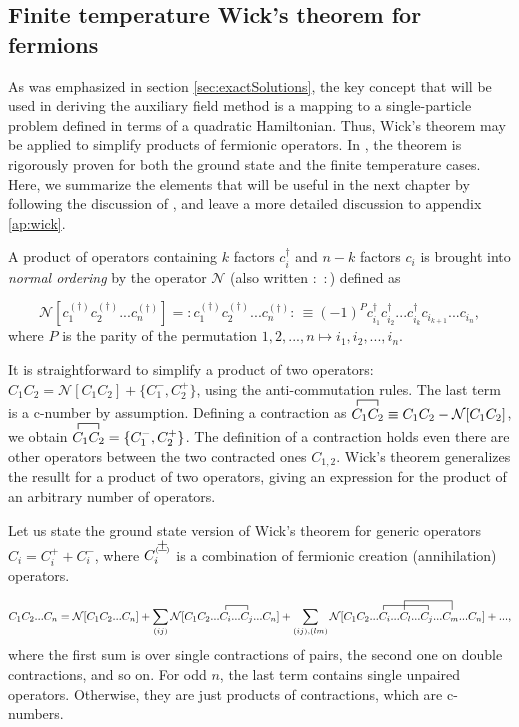 \subsection{Finite temperature Wick's theorem for fermions}
\label{subsec:wick}

As was emphasized in section \ref{sec:exactSolutions}, the key concept that will be used in deriving the auxiliary field method is a mapping to a single-particle problem defined in terms of a quadratic Hamiltonian.
Thus, Wick's theorem may be applied to simplify products of fermionic operators.
In \cite{fetter_quantum_2003}, the theorem is rigorously proven for both the ground state and the finite temperature cases.
Here, we summarize the elements that will be useful in the next chapter by following the discussion of \cite{molinari_notes_2017}, and leave a more detailed discussion to appendix \ref{ap:wick}.

A product of operators containing $k$ factors $c_i^\dagger$ and $n - k$ factors $c_i$ is brought into \emph{normal ordering} by the operator $\mathcal{N}$ (also written $: \,\,:$) defined as

\begin{equation}
\mathcal{N} [ c_1^{(\dagger)} c_2^{(\dagger)} ... c_n^{(\dagger)} ] = :  c_1^{(\dagger)} c_2^{(\dagger)} ... c_n^{(\dagger)}  : \, \equiv ( - 1 )^P c_{i_1}^{\dagger} c_{i_2}^{\dagger} ... c_{i_k}^{\dagger} c_{i_{k+1}} ... c_{i_n} ,
\end{equation}
where $P$ is the parity of the permutation $1, 2, ..., n \mapsto i_1, i_2, ..., i_n$.

It is straightforward to simplify a product of two operators: $C_1 C_2 = \mathcal{N} [ C_1 C_2 ] + \{ C_1^- , C_2^+ \} $, using the anti-commutation rules.
The last term is a c-number by assumption.
Defining a contraction as $\contraction{}{C}{ {}_1 }{C_2}
C_1 C_2 \equiv C_1 C_2 - \mathcal{N}[ C_1 C_2 ]$, we obtain $\contraction{}{C}{ {}_1 }{C_2}
C_1 C_2 =  \{ C_1^- , C_2^+ \}  $.
The definition of a contraction holds even there are other operators between the two contracted ones $C_{1, 2}$.
Wick's theorem generalizes the resullt for a product of two operators, giving an expression for the product of an arbitrary number of operators.

Let us state the ground state version of Wick's theorem for generic operators $C_i= C_i^+ + C_i^-$, where $C_i^{\Pm}$ is a combination of fermionic creation (annihilation) operators. 

\begin{equation}
C_1 C_2 ... C_n = \mathcal{N} [ C_1 C_2 ... C_n ] + \sum_{(ij)} \mathcal{N} [ C_1 C_2 ...
\contraction{}{C_i}{...}{C_j}
C_i ... C_j ... C_n ]
+ \sum_{(ij), (lm)} \mathcal{N} [ C_1 C_2 ...
\contraction{}{C}{ {}_i ... C_l ... }{C_j}
C_i ... 
\contraction[2ex]{}{C}{ {}_l ... C_j ... }{C_m}C_l ... C_j ... C_m ... C_n ] + ... ,
\end{equation}
where the first sum is over single contractions of pairs, the second one on double contractions, and so on.
For odd $n$, the last term contains single unpaired operators.
Otherwise, they are just products of contractions, which are c-numbers.

